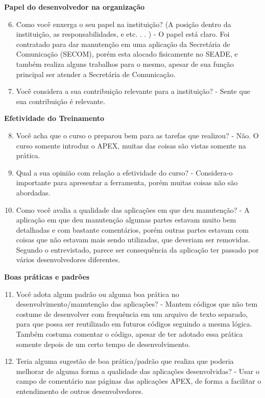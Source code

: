 \begin{apendicesenv}
\textbf{Papel do desenvolvedor na organização}

\begin{enumerate}
	\setcounter{enumi}{5}
	\item Como você enxerga o seu papel na instituição? (A posição dentro da instituição, as
	responsabilidades, e etc. . . )\newline
	-  O papel está claro. Foi contratado para dar manutenção em uma aplicação da Secretária de Comunicação (SECOM), porém esta alocado fisicamente no SEADE, e também realiza alguns trabalhos para o mesmo, apesar de sua função principal ser atender a Secretária de Comunicação.
	\item Você considera a sua contribuição relevante para a instituição?\newline
	- Sente que sua contribuição é relevante.
\end{enumerate}

\textbf{Efetividade do Treinamento}

\begin{enumerate}
	\setcounter{enumi}{7}
	\item Você acha que o curso o preparou bem para as tarefas que realizou?\newline
	- Não. O curso somente introduz o APEX, muitas das coisas são vistas somente na prática.
	\item Qual a sua opinião com relação a efetividade do curso?\newline
	- Considera-o importante para apresentar a ferramenta, porém muitas coisas não são abordadas.
	\item Como você avalia a qualidade das aplicações em que deu manutenção?\newline
	- A aplicação em que deu manutenção algumas partes estavam muito bem detalhadas e com bastante comentários, porém outras partes estavam com coisas que não estavam mais sendo utilizadas, que deveriam ser removidas. Segundo o entrevistado, parece ser consequência da aplicação ter passado por vários desenvolvedores diferentes.
\end{enumerate}

\textbf{Boas práticas e padrões}

\begin{enumerate}
	\setcounter{enumi}{10}
	\item Você adota algum padrão ou alguma boa prática no desenvolvimento/manutenção das
	aplicações?\newline
	- Mantem códigos que não tem costume de desenvolver com frequência em um arquivo de texto separado, para que possa ser reutilizado em futuros códigos seguindo a mesma lógica. Também costuma comentar o código, apesar de ter adotado essa prática somente depois de um certo tempo de desenvolvimento.
	\item Teria alguma sugestão de boa prática/padrão que realiza que poderia melhorar de
	alguma forma a qualidade das aplicações desenvolvidas?\newline
	- Usar o campo de comentário nas páginas das aplicações APEX, de forma a facilitar o entendimento de outros desenvolvedores.
\end{enumerate}


\end{apendicesenv}
